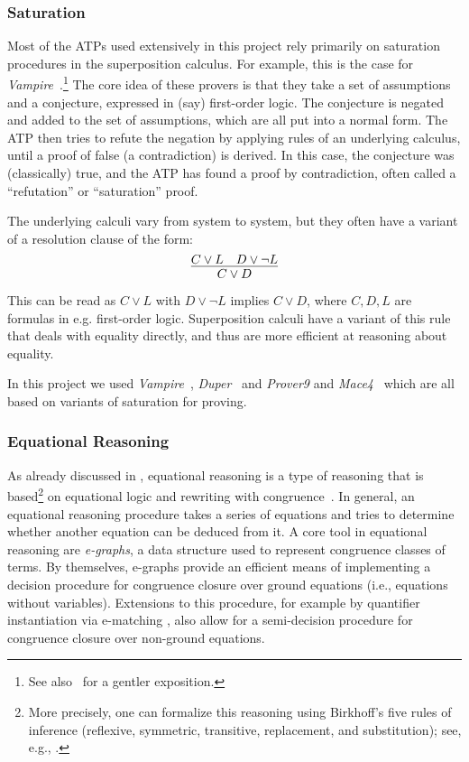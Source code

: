 \subsubsection{Saturation}
Most of the ATPs used extensively in this project rely primarily on saturation procedures in the superposition calculus.
For example, this is the case for \emph{Vampire}~\cite{DBLP:conf/cav/KovacsV13}.\footnote{See also~\cite{DBLP:journals/cacm/BentkampBNTVW23} for a gentler exposition.}
The core idea of these provers is that they take a set of assumptions and a conjecture, expressed in (say) first-order logic.
The conjecture is negated and added to the set of assumptions, which are all put into a normal form.
The ATP then tries to refute the negation by applying rules of an underlying calculus, until a proof of false (a contradiction) is derived.
In this case, the conjecture was (classically) true, and the ATP has found a proof by contradiction, often called a ``refutation'' or ``saturation'' proof.

The underlying calculi vary from system to system, but they often have a variant of a resolution clause of the form:
\[\infer{C \lor D}{C \lor L \quad D \lor \neg L} \]
This can be read as $C \lor L$ with $D \lor \neg L$ implies $C \lor D$, where $C, D, L$ are formulas in e.g. first-order logic.
Superposition calculi have a variant of this rule that deals with equality directly, and thus are more efficient at reasoning about equality.

In this project we used \emph{Vampire}~\cite{DBLP:conf/cav/KovacsV13}, \emph{Duper}~\cite{DBLP:conf/itp/CluneQBA24} and \emph{Prover9} and \emph{Mace4}~\cite{prover9-mace4} which are all based on variants of saturation for proving.

\subsubsection{Equational Reasoning} As already discussed in , equational reasoning is a type of reasoning that is based\footnote{More precisely, one can formalize this reasoning using Birkhoff's five rules of inference (reflexive, symmetric, transitive, replacement, and substitution); see, e.g., \cite{burris}.} on equational logic and rewriting with congruence~\cite{term-rewriting}.
In general, an equational reasoning procedure takes a series of equations and tries to determine whether another equation can be deduced from it.
A core tool in equational reasoning are \emph{e-graphs}, a data structure used to represent congruence classes of terms.
By themselves, e-graphs provide an efficient means of implementing a decision procedure for congruence closure over ground equations (i.e., equations without variables).
Extensions to this procedure, for example by quantifier instantiation via e-matching \cite{DBLP:conf/cade/MouraB07}, also allow for a semi-decision procedure for congruence closure over non-ground equations.

